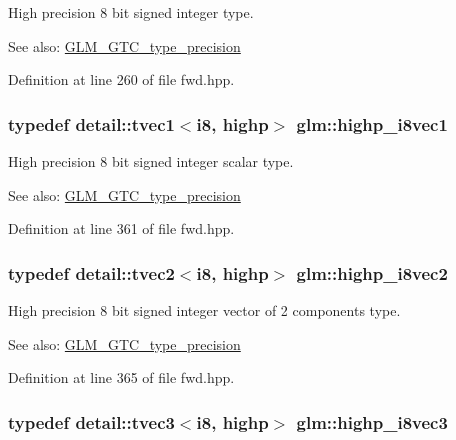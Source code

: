 High precision 8 bit signed integer type. \begin{Desc}
\item[See also:]\hyperlink{group__gtc__type__precision}{GLM\_\-GTC\_\-type\_\-precision} \end{Desc}


Definition at line 260 of file fwd.hpp.\hypertarget{group__gtc__type__precision_g0334353753f93388bcc89f91c9aff476}{
\subsubsection[highp\_\-i8vec1]{\setlength{\rightskip}{0pt plus 5cm}typedef detail::tvec1$<$i8, highp$>$ {\bf glm::highp\_\-i8vec1}}}
\label{group__gtc__type__precision_g0334353753f93388bcc89f91c9aff476}


High precision 8 bit signed integer scalar type. \begin{Desc}
\item[See also:]\hyperlink{group__gtc__type__precision}{GLM\_\-GTC\_\-type\_\-precision} \end{Desc}


Definition at line 361 of file fwd.hpp.\hypertarget{group__gtc__type__precision_g2224945795a870e41d951f0847d54f02}{
\subsubsection[highp\_\-i8vec2]{\setlength{\rightskip}{0pt plus 5cm}typedef detail::tvec2$<$i8, highp$>$ {\bf glm::highp\_\-i8vec2}}}
\label{group__gtc__type__precision_g2224945795a870e41d951f0847d54f02}


High precision 8 bit signed integer vector of 2 components type. \begin{Desc}
\item[See also:]\hyperlink{group__gtc__type__precision}{GLM\_\-GTC\_\-type\_\-precision} \end{Desc}


Definition at line 365 of file fwd.hpp.\hypertarget{group__gtc__type__precision_gd716792169ce7de963df25b865714438}{
\subsubsection[highp\_\-i8vec3]{\setlength{\rightskip}{0pt plus 5cm}typedef detail::tvec3$<$i8, highp$>$ {\bf glm::highp\_\-i8vec3}}}
\label{group__gtc__type__precision_gd716792169ce7de963df25b865714438}


